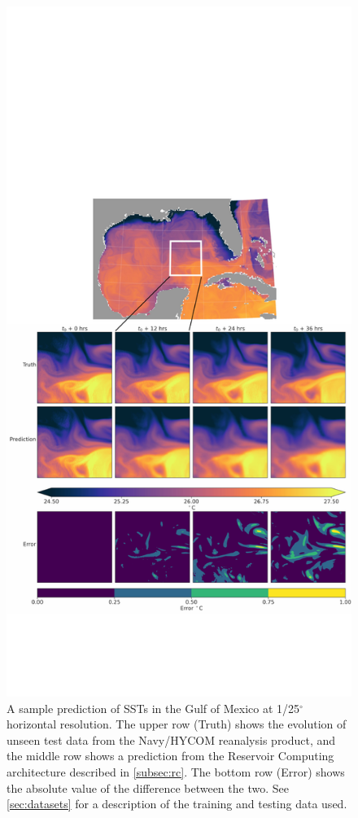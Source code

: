 \begin{figure}
    \centering
    \includegraphics[width=.8\textwidth]{../figures/rc_gom_sst.pdf}
    \caption{A sample prediction of SSTs in the Gulf of Mexico at 1/25$^\circ$
        horizontal resolution.
        The upper row (Truth) shows the evolution of unseen test data from the
        Navy/HYCOM reanalysis product, and the middle row shows a prediction
        from the Reservoir Computing architecture described in
        \cref{subsec:rc}.
        The bottom row (Error) shows the absolute value of the difference between the two.
        See \cref{sec:datasets} for a description of the training and testing data
        used.
    }
    \label{fig:gom_sst}
\end{figure}


